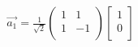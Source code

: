 \documentclass[preview]{standalone}
\begin{document}
\begin{align*}
\vec{a_1} = \frac{1}{\sqrt{2}} \left({\begin{array}{cc} 1 & 1 \\ 1 & -1 \\ \end{array}} \right) \left[{\begin{array}{cc} 1 \\ 0 \\ \end{array}} \right]
\end{align*}
\end{document}
